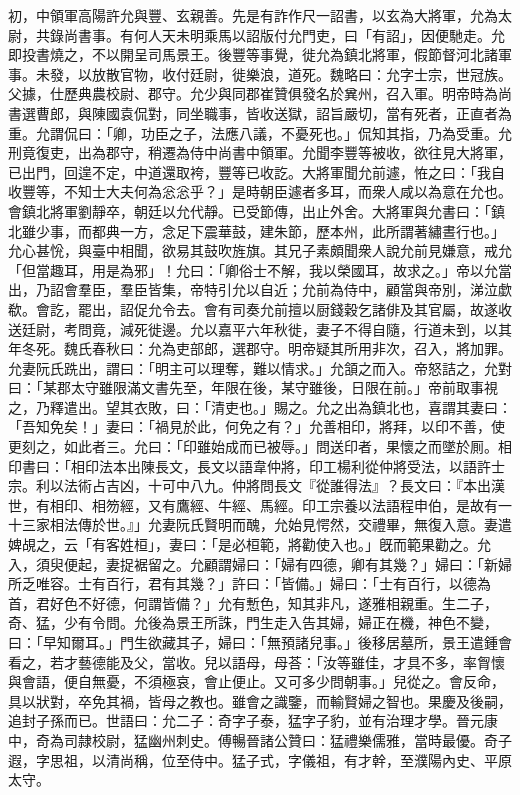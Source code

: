 \begin{pinyinscope}
初，中領軍高陽許允與豐、玄親善。先是有詐作尺一詔書，以玄為大將軍，允為太尉，共錄尚書事。有何人天未明乘馬以詔版付允門吏，曰「有詔」，因便馳走。允即投書燒之，不以開呈司馬景王。後豐等事覺，徙允為鎮北將軍，假節督河北諸軍事。未發，以放散官物，收付廷尉，徙樂浪，道死。魏略曰：允字士宗，世冠族。父據，仕歷典農校尉、郡守。允少與同郡崔贊俱發名於兾州，召入軍。明帝時為尚書選曹郎，與陳國袁侃對，同坐職事，皆收送獄，詔旨嚴切，當有死者，正直者為重。允謂侃曰：「卿，功臣之子，法應八議，不憂死也。」侃知其指，乃為受重。允刑竟復吏，出為郡守，稍遷為侍中尚書中領軍。允聞李豐等被收，欲往見大將軍，已出門，回遑不定，中道還取袴，豐等已收訖。大將軍聞允前遽，恠之曰：「我自收豐等，不知士大夫何為忩忩乎？」是時朝臣遽者多耳，而衆人咸以為意在允也。會鎮北將軍劉靜卒，朝廷以允代靜。已受節傳，出止外舍。大將軍與允書曰：「鎮北雖少事，而都典一方，念足下震華鼓，建朱節，歷本州，此所謂著繡晝行也。」允心甚恱，與臺中相聞，欲易其鼓吹旌旗。其兄子素頗聞衆人說允前見嫌意，戒允「但當趣耳，用是為邪」！允曰：「卿俗士不解，我以榮國耳，故求之。」帝以允當出，乃詔會羣臣，羣臣皆集，帝特引允以自近；允前為侍中，顧當與帝別，涕泣歔欷。會訖，罷出，詔促允令去。會有司奏允前擅以厨錢穀乞諸俳及其官屬，故遂收送廷尉，考問竟，減死徙邊。允以嘉平六年秋徙，妻子不得自隨，行道未到，以其年冬死。魏氏春秋曰：允為吏部郎，選郡守。明帝疑其所用非次，召入，將加罪。允妻阮氏跣出，謂曰：「明主可以理奪，難以情求。」允頷之而入。帝怒詰之，允對曰：「某郡太守雖限滿文書先至，年限在後，某守雖後，日限在前。」帝前取事視之，乃釋遣出。望其衣敗，曰：「清吏也。」賜之。允之出為鎮北也，喜謂其妻曰：「吾知免矣！」妻曰：「禍見於此，何免之有？」允善相印，將拜，以印不善，使更刻之，如此者三。允曰：「印雖始成而已被辱。」問送印者，果懷之而墜於厠。相印書曰：「相印法本出陳長文，長文以語韋仲將，印工楊利從仲將受法，以語許士宗。利以法術占吉凶，十可中八九。仲將問長文『從誰得法』？長文曰：『本出漢世，有相印、相笏經，又有鷹經、牛經、馬經。印工宗養以法語程申伯，是故有一十三家相法傳於世。』」允妻阮氏賢明而醜，允始見愕然，交禮畢，無復入意。妻遣婢覘之，云「有客姓桓」，妻曰：「是必桓範，將勸使入也。」旣而範果勸之。允入，須臾便起，妻捉裾留之。允顧謂婦曰：「婦有四德，卿有其幾？」婦曰：「新婦所乏唯容。士有百行，君有其幾？」許曰：「皆備。」婦曰：「士有百行，以德為首，君好色不好德，何謂皆備？」允有慙色，知其非凡，遂雅相親重。生二子，奇、猛，少有令問。允後為景王所誅，門生走入告其婦，婦正在機，神色不變，曰：「早知爾耳。」門生欲藏其子，婦曰：「無預諸兒事。」後移居墓所，景王遣鍾會看之，若才藝德能及父，當收。兒以語母，母荅：「汝等雖佳，才具不多，率胷懷與會語，便自無憂，不須極哀，會止便止。又可多少問朝事。」兒從之。會反命，具以狀對，卒免其禍，皆母之教也。雖會之識鑒，而輸賢婦之智也。果慶及後嗣，追封子孫而已。世語曰：允二子：奇字子泰，猛字子豹，並有治理才學。晉元康中，奇為司隷校尉，猛幽州刺史。傅暢晉諸公贊曰：猛禮樂儒雅，當時最優。奇子遐，字思祖，以清尚稱，位至侍中。猛子式，字儀祖，有才幹，至濮陽內史、平原太守。


\end{pinyinscope}

